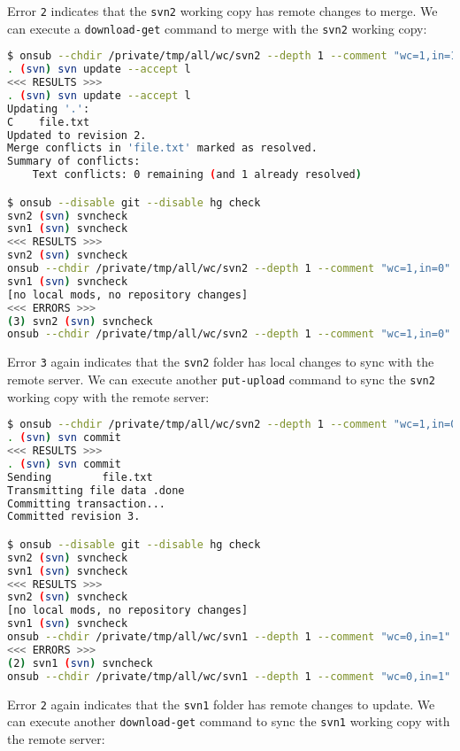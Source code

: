Error \lstinline{2} indicates that the \lstinline{svn2} working copy has remote changes to merge. We can execute a \lstinline{download-get} command to merge with the \lstinline{svn2} working copy:

\begin{snugshade}
\begin{lstlisting}[language=bash]	
$ onsub --chdir /private/tmp/all/wc/svn2 --depth 1 --comment "wc=1,in=1" {download-get}
. (svn) svn update --accept l
<<< RESULTS >>>
. (svn) svn update --accept l
Updating '.':
C    file.txt
Updated to revision 2.
Merge conflicts in 'file.txt' marked as resolved.
Summary of conflicts:
	Text conflicts: 0 remaining (and 1 already resolved)

$ onsub --disable git --disable hg check
svn2 (svn) svncheck
svn1 (svn) svncheck
<<< RESULTS >>>
svn2 (svn) svncheck
onsub --chdir /private/tmp/all/wc/svn2 --depth 1 --comment "wc=1,in=0" {put-upload}
svn1 (svn) svncheck
[no local mods, no repository changes]
<<< ERRORS >>>
(3) svn2 (svn) svncheck
onsub --chdir /private/tmp/all/wc/svn2 --depth 1 --comment "wc=1,in=0" {put-upload}
\end{lstlisting}
\end{snugshade}

Error \lstinline{3} again indicates that the \lstinline{svn2} folder has local changes to sync with the remote server. We can execute another \lstinline{put-upload} command to sync the \lstinline{svn2} working copy with the remote server:

\begin{snugshade}
\begin{lstlisting}[language=bash]	
$ onsub --chdir /private/tmp/all/wc/svn2 --depth 1 --comment "wc=1,in=0" {put-upload}
. (svn) svn commit
<<< RESULTS >>>
. (svn) svn commit
Sending        file.txt
Transmitting file data .done
Committing transaction...
Committed revision 3.

$ onsub --disable git --disable hg check
svn2 (svn) svncheck
svn1 (svn) svncheck
<<< RESULTS >>>
svn2 (svn) svncheck
[no local mods, no repository changes]
svn1 (svn) svncheck
onsub --chdir /private/tmp/all/wc/svn1 --depth 1 --comment "wc=0,in=1" {download-get}
<<< ERRORS >>>
(2) svn1 (svn) svncheck
onsub --chdir /private/tmp/all/wc/svn1 --depth 1 --comment "wc=0,in=1" {download-get}
\end{lstlisting}
\end{snugshade}

Error \lstinline{2} again indicates that the \lstinline{svn1} folder has remote changes to update. We can execute another \lstinline{download-get} command to sync the \lstinline{svn1} working copy with the remote server:

